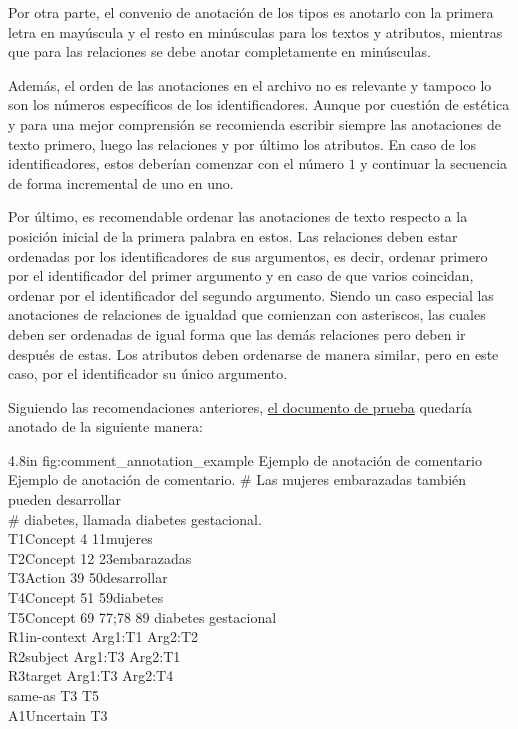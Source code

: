 Por otra parte, el convenio de anotación de los tipos es anotarlo con la primera letra en mayúscula y el resto en minúsculas para los textos y atributos, mientras que para las relaciones se debe anotar completamente en minúsculas.

Además, el orden de las anotaciones en el archivo no es relevante y tampoco lo son los números específicos de los identificadores. Aunque por cuestión de estética y para una mejor comprensión se recomienda escribir siempre las anotaciones de texto primero, luego las relaciones y por último los atributos. En caso de los identificadores, estos deberían comenzar con el número $1$ y continuar la secuencia de forma incremental de uno en uno.

Por último, es recomendable ordenar las anotaciones de texto respecto a la posición inicial de la primera palabra en estos. Las relaciones deben estar ordenadas por los identificadores de sus argumentos, es decir, ordenar primero por el identificador del primer argumento y en caso de que varios coincidan, ordenar por el identificador del segundo argumento. Siendo un caso especial las anotaciones de relaciones de igualdad que comienzan con asteriscos, las cuales deben ser ordenadas de igual forma que las demás relaciones pero deben ir después de estas. Los atributos deben ordenarse de manera similar, pero en este caso, por el identificador su único argumento.

Siguiendo las recomendaciones anteriores, \hyperref[sentence:annotation_example]{el documento de prueba} quedaría anotado de la siguiente manera:

\begin{annexample}
	[backgroundcolor=cyan!13]
	{4.8in}
	{fig:comment_annotation_example}
	{Ejemplo de anotación de comentario}
	{Ejemplo de anotación de comentario.}
	\# Las mujeres embarazadas también pueden desarrollar\\
	\# diabetes, llamada diabetes gestacional.\\
	T1\space\space Concept 4 11\space\space\space\space mujeres\\
	T2\space\space Concept 12 23\space\space\space embarazadas\\
	T3\space\space Action 39 50\space\space\space\space desarrollar\\
	T4\space\space Concept 51 59\space\space\space diabetes\\
	T5\space\space Concept 69 77;78 89 diabetes gestacional\\
	R1\space\space in-context Arg1:T1 Arg2:T2\\
	R2\space\space subject Arg1:T3 Arg2:T1\\
	R3\space\space target Arg1:T3 Arg2:T4\\
	\textasteriskcentered\space\space\space same-as T3 T5\\
	A1\space\space Uncertain T3
\end{annexample}

